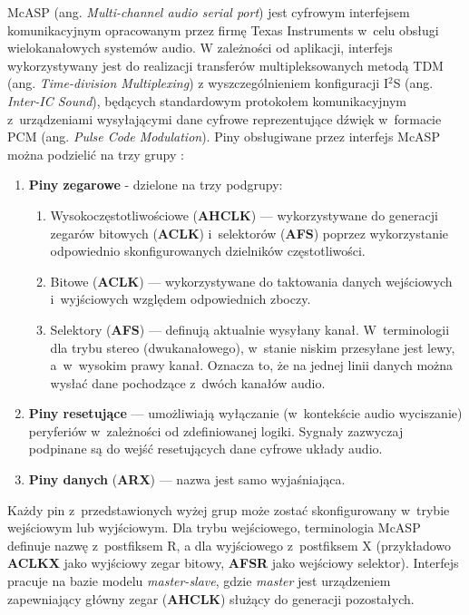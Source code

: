 McASP (ang. \textit{Multi-channel audio serial port}) jest cyfrowym interfejsem
komunikacyjnym opracowanym przez firmę Texas Instruments w~celu obsługi
wielokanałowych systemów audio. W zależności od aplikacji, interfejs
wykorzystywany jest do realizacji transferów multipleksowanych metodą TDM (ang.
\textit{Time-division Multiplexing}) z wyszczególnieniem konfiguracji I$^2$S
(ang. \textit{Inter-IC Sound}), będących standardowym protokołem komunikacyjnym
z~urządzeniami wysyłającymi dane cyfrowe reprezentujące dźwięk w~formacie PCM
(ang. \textit{Pulse Code Modulation}). Piny obsługiwane przez interfejs McASP
można podzielić na trzy grupy \cite{bib:mcasp}:
\begin{enumerate}

    \item \textbf{Piny zegarowe} - dzielone na trzy podgrupy:
    \begin{enumerate}

        \item Wysokoczęstotliwościowe (\textbf{AHCLK}) --- wykorzystywane do
        generacji zegarów bitowych (\textbf{ACLK}) i~selektorów (\textbf{AFS})
        poprzez wykorzystanie odpowiednio skonfigurowanych dzielników
        częstotliwości.

        \item Bitowe (\textbf{ACLK}) --- wykorzystywane do taktowania danych
        wejściowych i~wyjściowych względem odpowiednich zboczy.

        \item Selektory (\textbf{AFS}) --- definują aktualnie wysyłany kanał.
        W~terminologii dla trybu stereo (dwukanałowego), w~stanie niskim
        przesyłane jest lewy, a~w~wysokim prawy kanał. Oznacza to, że na jednej
        linii danych można wysłać dane pochodzące z~dwóch kanałów audio.

    \end{enumerate}

    \item \textbf{Piny resetujące} --- umożliwiają wyłączanie (w~kontekście
    audio wyciszanie) peryferiów w~zależności od zdefiniowanej logiki. Sygnały
    zazwyczaj podpinane są do wejść resetujących dane cyfrowe układy audio.

    \item \textbf{Piny danych} (\textbf{ARX}) --- nazwa jest samo wyjaśniająca. 

\end{enumerate}

Każdy pin z~przedstawionych wyżej grup może zostać skonfigurowany w~trybie
wejściowym lub wyjściowym. Dla trybu wejściowego, terminologia McASP definuje
nazwę z~postfiksem R, a dla wyjściowego z~postfiksem X (przykładowo
\textbf{ACLKX} jako wyjściowy zegar bitowy, \textbf{AFSR} jako wejściowy
selektor). Interfejs pracuje na bazie modelu \textit{master-slave}, gdzie
\textit{master} jest urządzeniem zapewniający główny zegar (\textbf{AHCLK})
służący do generacji pozostałych.

